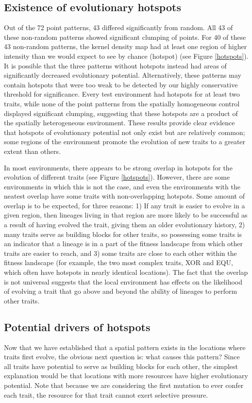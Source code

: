 \subsection{Existence of evolutionary hotspots}
Out of the 72 point patterns, 43 differed significantly from random. All 43 of these non-random patterns showed significant clumping of points. For 40 of these 43 non-random patterns, the kernel density map had at least one region of higher intensity than we would expect to see by chance (hotspot) (see Figure \ref{hotspots}). It is possible that the three patterns without hotspots instead had areas of significantly decreased evolutionary potential. Alternatively, these patterns may contain hotspots that were too weak to be detected by our highly conservative threshold for significance. Every test environment had hotspots for at least two traits, while none of the point patterns from the spatially homogeneous control displayed significant clumping, suggesting that these hotspots are a product of the spatially heterogeneous environment. These results provide clear evidence that hotspots of evolutionary potential not only exist but are relatively common; some regions of the environment promote the evolution of new traits to a greater extent than others.

In most environments, there appears to be strong overlap in hotspots for the evolution of different traits (see Figure \ref{hotspots}). However, there are some environments in which this is not the case, and even the environments with the neatest overlap have some traits with non-overlapping hotspots. Some amount of overlap is to be expected, for three reasons: 1) If any trait is easier to evolve in a given region, then lineages living in that region are more likely to be successful as a result of having evolved the trait, giving them an older evolutionary history, 2) many traits serve as building blocks for other traits, so possessing some traits is an indicator that a lineage is in a part of the fitness landscape from which other traits are easier to reach, and 3) some traits are close to each other within the fitness landscape (for example, the two most complex traits, XOR and EQU, which often have hotspots in nearly identical locations). The fact that the overlap is not universal suggests that the local environment has effects on the likelihood of evolving a trait that go above and beyond the ability of lineages to perform other traits.  

\subsection{Potential drivers of hotspots}
Now that we have established that a spatial pattern exists in the locations where traits first evolve, the obvious next question is: what causes this pattern? Since all traits have potential to serve as building blocks for each other, the simplest explanation would be that locations with more resources have higher evolutionary potential. Note that because we are considering the first mutation to ever confer each trait, the resource for that trait cannot exert selective pressure.

